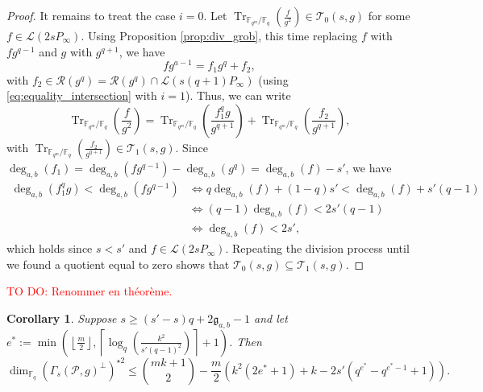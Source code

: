 \documentclass[a4paper]{article}
\newtheorem{coro}[thm]{Corollary}
\theoremstyle{definition}
\theoremstyle{remark}
\newcommand{\calP}{\mathcal{P}}
\newcommand{\calL}{\mathcal{L}}
\newcommand{\calR}{\mathcal{R}}
\newcommand{\calT}{\mathcal{T}}
\newcommand{\fq}{\mathbb{F}_{q}}
\newcommand{\Tr}[1]{\operatorname{Tr}_{\mathbb{F}_{q^m}/\fq}\left(#1\right)}
\newcommand{\degab}[1]{\deg_{a,b}\left(#1\right)}
\newcommand\TODO[1]{\textcolor{red}{TO DO: #1}}
\begin{document}
\begin{proof}
\noindent It remains to treat the case $i=0$. Let $\Tr{\frac{f}{g^2}} \in \calT_0(s,g)$ for some $f \in \calL(2sP_\infty)$. Using Proposition \ref{prop:div_grob}, this time replacing $f$ with $fg^{q-1}$ and $g$ with $g^{q+1}$, we have
$$fg^{a-1} = f_1g^q + f_2,$$ with $f_2 \in \calR(g^q) = \calR(g^q) \cap \calL(s(q+1)P_\infty)$ (using \eqref{eq:equality_intersection} with $i=1$).
Thus, we can write
    $$ \Tr{\frac{f}{g^2}} = \Tr{\frac{f_1^qg}{g^{q+1}}}  + \Tr{\frac{f_2}{g^{q+1}}}, $$
with $\Tr{\frac{f_2}{g^{q+1}}} \in \calT_1(s,g)$. Since $\degab{f_1} = \degab{fg^{q-1}} - \degab{g^q} = \degab{f}-s'$, we have 
\begin{align*}
     \degab{f_1^qg} < \degab{fg^{q-1}} & \iff q\degab{f} +(1-q)s' < \degab{f} + s'(q-1)\\
                                               & \iff (q-1)\degab{f} < 2s'(q-1)\\
                                               & \iff \degab{f} < 2s',
\end{align*}
which holds since $s<s'$ and $f \in \calL(2sP_\infty)$. Repeating the division process until we found a quotient equal to zero shows that $\calT_0(s,g) \subseteq \calT_1(s,g)$.
\end{proof}

\TODO{Renommer en théorème.}

\begin{coro} \label{coro:bound_with_T_i's_inclusion}
Suppose $s \geq (s'-s)q+2\mathfrak{g}_{a,b}-1$ and let $e^* := \min\left(\left\lfloor \frac{m}{2} \right\rfloor, \left\lceil \log_q\left(\frac{k^2}{s'(q-1)^2}\right)\right\rceil+1\right)$. Then
$$\dim_{\fq} (\Gamma_s(\calP,g)^{\perp})^{\star 2}\leq \binom{mk+1}{2} - \dfrac{m}{2}(k^2(2e^*+1)+k-2s'(q^{e^*}-q^{e^*-1}+1)). $$
\end{coro}
\end{document}
